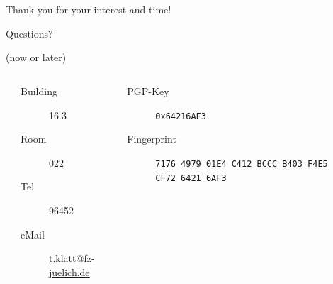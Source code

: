 \documentclass[english,hyperref={pdfpagelabels=false},aspectratio=1610]{beamer}
\begin{document}
\begin{frame}
  \frametitle{~}
  \begin{center}
    {\huge Thank you for your interest and time!}\par
    \bigskip
    \bigskip
    \bigskip
    {\Large Questions?}\par
    {\scriptsize\color{fzjgray50}(now or later)}\par
    \bigskip
    \bigskip
    \begin{columns}
      \tiny
      \begin{column}{0.1\textwidth}
      \end{column}
      \begin{column}{0.4\textwidth}
        \begin{description}
          \item[Building] 16.3
          \item[Room] 022
          \item[Tel] 96452
          \item[eMail] \href{mailto:t.klatt@fz-juelich.de}{t.klatt@fz-juelich.de}
        \end{description}
      \end{column}
      \begin{column}{0.38\textwidth}
        \begin{description}
          \item[PGP-Key] \texttt{0x64216AF3}
          \item[Fingerprint] \texttt{7176 4979 01E4 C412 BCCC B403 F4E5 CF72 6421 6AF3}
        \end{description}
      \end{column}
      \begin{column}{0.12\textwidth}
      \end{column}
    \end{columns}
  \end{center}
\end{frame}
\end{document}
